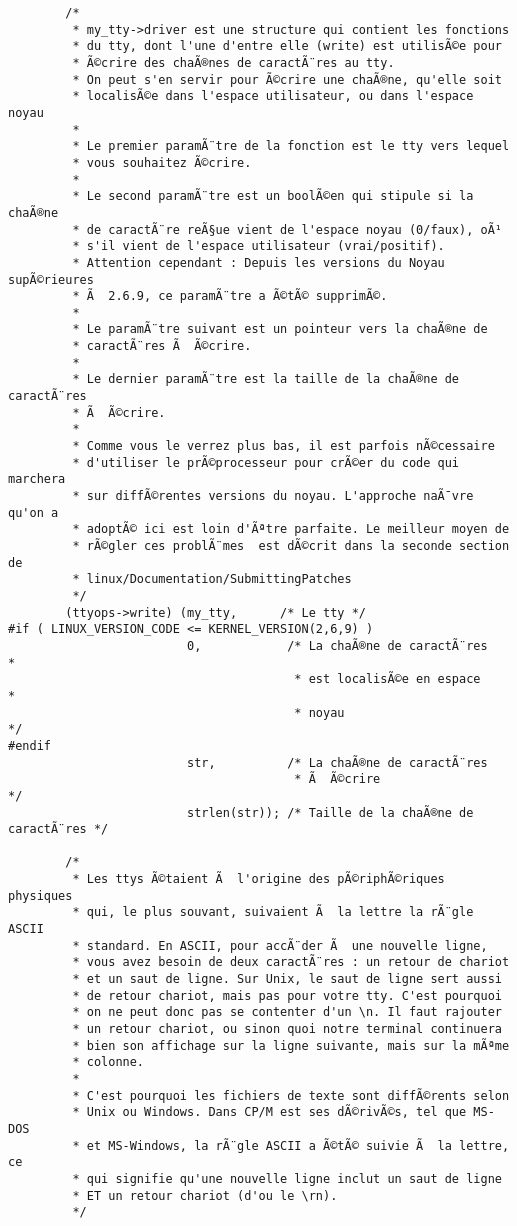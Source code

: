 \documentclass[11pt]{article}
\begin{document}
\begin{verbatim}
        /*
         * my_tty->driver est une structure qui contient les fonctions
         * du tty, dont l'une d'entre elle (write) est utilisÃ©e pour
         * Ã©crire des chaÃ®nes de caractÃ¨res au tty.
         * On peut s'en servir pour Ã©crire une chaÃ®ne, qu'elle soit
         * localisÃ©e dans l'espace utilisateur, ou dans l'espace noyau
         *
         * Le premier paramÃ¨tre de la fonction est le tty vers lequel
         * vous souhaitez Ã©crire.
         *
         * Le second paramÃ¨tre est un boolÃ©en qui stipule si la chaÃ®ne
         * de caractÃ¨re reÃ§ue vient de l'espace noyau (0/faux), oÃ¹
         * s'il vient de l'espace utilisateur (vrai/positif).
         * Attention cependant : Depuis les versions du Noyau supÃ©rieures
         * Ã  2.6.9, ce paramÃ¨tre a Ã©tÃ© supprimÃ©.
         *
         * Le paramÃ¨tre suivant est un pointeur vers la chaÃ®ne de
         * caractÃ¨res Ã  Ã©crire.
         *
         * Le dernier paramÃ¨tre est la taille de la chaÃ®ne de caractÃ¨res
         * Ã  Ã©crire.
         *
         * Comme vous le verrez plus bas, il est parfois nÃ©cessaire
         * d'utiliser le prÃ©processeur pour crÃ©er du code qui marchera
         * sur diffÃ©rentes versions du noyau. L'approche naÃ¯vre qu'on a
         * adoptÃ© ici est loin d'Ãªtre parfaite. Le meilleur moyen de
         * rÃ©gler ces problÃ¨mes  est dÃ©crit dans la seconde section de
         * linux/Documentation/SubmittingPatches
         */
        (ttyops->write) (my_tty,      /* Le tty */
#if ( LINUX_VERSION_CODE <= KERNEL_VERSION(2,6,9) )
                         0,            /* La chaÃ®ne de caractÃ¨res           *
                                        * est localisÃ©e en espace           *
                                        * noyau                             */
#endif
                         str,          /* La chaÃ®ne de caractÃ¨res
                                        * Ã  Ã©crire                          */
                         strlen(str)); /* Taille de la chaÃ®ne de caractÃ¨res */

        /*
         * Les ttys Ã©taient Ã  l'origine des pÃ©riphÃ©riques physiques
         * qui, le plus souvant, suivaient Ã  la lettre la rÃ¨gle ASCII
         * standard. En ASCII, pour accÃ¨der Ã  une nouvelle ligne,
         * vous avez besoin de deux caractÃ¨res : un retour de chariot
         * et un saut de ligne. Sur Unix, le saut de ligne sert aussi
         * de retour chariot, mais pas pour votre tty. C'est pourquoi
         * on ne peut donc pas se contenter d'un \n. Il faut rajouter
         * un retour chariot, ou sinon quoi notre terminal continuera
         * bien son affichage sur la ligne suivante, mais sur la mÃªme
         * colonne.
         *
         * C'est pourquoi les fichiers de texte sont diffÃ©rents selon
         * Unix ou Windows. Dans CP/M est ses dÃ©rivÃ©s, tel que MS-DOS
         * et MS-Windows, la rÃ¨gle ASCII a Ã©tÃ© suivie Ã  la lettre, ce
         * qui signifie qu'une nouvelle ligne inclut un saut de ligne
         * ET un retour chariot (d'ou le \rn).
         */


\end{verbatim}
\end{document}

